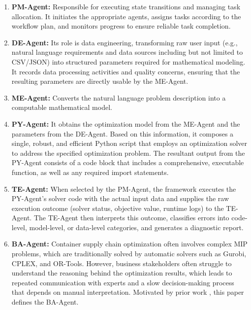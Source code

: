 \documentclass[preprint,12pt]{elsarticle}
\begin{document}
\begin{enumerate}[label=\arabic*)]
 \item \textbf{PM-Agent:} Responsible for executing state transitions and managing task allocation. It initiates the appropriate agents, assigns tasks according to the workflow plan, and monitors progress to ensure reliable task completion.
 \item \textbf{DE-Agent:} Its role is data engineering, transforming raw user input (e.g., natural language requirements and data sources including but not limited to CSV/JSON) into structured parameters required for mathematical modeling. It records data processing activities and quality concerns, ensuring that the resulting parameters are directly usable by the ME-Agent.
 \item \textbf{ME-Agent:} Converts the natural language problem description into a computable mathematical model.
 \item \textbf{PY-Agent:} It obtains the optimization model from the ME-Agent and the parameters from the DE-Agent. Based on this information, it composes a single, robust, and efficient Python script that employs an optimization solver to address the specified optimization problem. The resultant output from the PY-Agent consists of a code block that includes a comprehensive, executable function, as well as any required import statements.
 \item \textbf{TE-Agent:} When selected by the PM-Agent, the framework executes the PY-Agent's solver code with the actual input data and supplies the raw execution outcome (solver status, objective value, runtime logs) to the TE-Agent. The TE-Agent then interprets this outcome, classifies errors into code-level, model-level, or data-level categories, and generates a diagnostic report.
 \item \textbf{BA-Agent:} Container supply chain optimization often involves complex MIP problems, which are traditionally solved by automatic solvers such as Gurobi, CPLEX, and OR-Tools. However, business stakeholders often struggle to understand the reasoning behind the optimization results, which leads to repeated communication with experts and a slow decision-making process that depends on manual interpretation. Motivated by prior work \citep{liLargeLanguageModels2023}, this paper defines the BA-Agent.
\end{enumerate}
\end{document}
